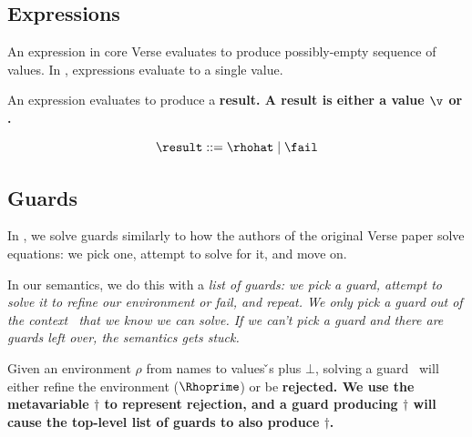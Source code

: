 \documentclass[article,screen,12pt, nonacm]{acmart}
\begin{document}
\bigskip
    
    \subsection{Expressions}
    
    \newcommand\GNoTree{\vmrung \rightsquigarrow \uppsidown} 
    
    An expression in core Verse evaluates to produce possibly-empty sequence of
    values. In {\VMinus}, expressions evaluate to a single value. 

    An expression evaluates to produce a \bf{result}. A result is either a
    value $\v$ or \fail. 
    
    \[\result\; \rm{::=}\; \rhohat\; \vert \; \fail \]
    
\subsection{Guards}

In {\VMinus}, we solve guards similarly to how the authors of the original Verse
paper solve equations: we pick one, attempt to solve for it, and move on. 

In our semantics, we do this with a \it{list} of guards: we pick a guard,
attempt to solve it to refine our environment or fail, and repeat. We only pick
a guard out of the context \context\ that we know we can solve. If we can't pick
a guard and there are guards left over, the semantics gets stuck.

Given an environment $\rho$ from names to values {\v}s plus $\bot$, solving a
guard \g\ will either refine the environment ($\Rhoprime$) or be \bf{rejected}.
We use the metavariable $\dagger$ to represent rejection, and a guard producing
$\dagger$ will cause the top-level list of guards to also produce $\dagger$. 

    \gfail


    
\end{document}
